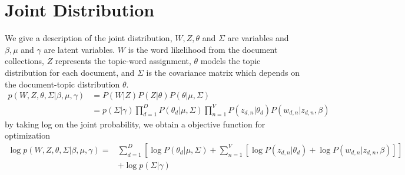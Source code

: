 \section{Joint Distribution}
We give a description of the joint distribution, $ W,Z,\theta $ and $ \Sigma $ are variables and $ \beta, \mu $ and $ \gamma $ are latent variables. $ W $ is the word likelihood from the document collections, $ Z $ represents the topic-word assignment, $ \theta $ models the topic distribution for each document, and $ \Sigma $ is the covariance matrix which depends on the document-topic distribution $ \theta $.
\begin{align*}
p(W,Z,\theta,\Sigma|\beta,\mu,\gamma)&=P(W|Z)P(Z|\theta)P(\theta|\mu,\Sigma)\\
&=p(\Sigma|\gamma)\prod_{d=1}^{D}P(\theta_d|\mu,\Sigma)\prod_{n=1}^{V}P(z_{d,n}|\theta_d)P(w_{d,n}|z_{d,n},\beta)
\end{align*}
by taking  log on the joint probability, we obtain a objective function for optimization
\begin{align*}
\log p(W,Z,\theta,\Sigma|\beta,\mu,\gamma)=&\sum_{d=1}^{D}\left[\log P(\theta_d|\mu,\Sigma)+\sum_{n=1}^{V}\left[\log P(z_{d,n}|\theta_d)+\log P(w_{d,n}|z_{d,n},\beta)\right]\right]\\
&+\log p(\Sigma|\gamma)
\end{align*}